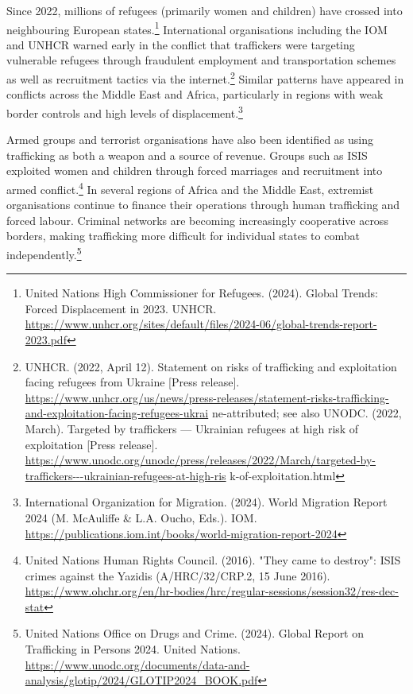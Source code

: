 Since 2022, millions of refugees (primarily women and children) have crossed into neighbouring European states.\footnote{United Nations High Commissioner for Refugees. (2024). Global Trends: Forced Displacement in 2023. UNHCR. \url{https://www.unhcr.org/sites/default/files/2024-06/global-trends-report-2023.pdf}} International organisations including the IOM and UNHCR warned early in the conflict that traffickers were targeting vulnerable refugees through fraudulent employment and transportation schemes as well as recruitment tactics via the internet.\footnote{UNHCR. (2022, April 12). Statement on risks of trafficking and exploitation facing refugees from Ukraine [Press release]. \url{https://www.unhcr.org/us/news/press-releases/statement-risks-trafficking-and-exploitation-facing-refugees-ukrai} ne-attributed; see also UNODC. (2022, March). Targeted by traffickers — Ukrainian refugees at high risk of exploitation [Press release]. \url{https://www.unodc.org/unodc/press/releases/2022/March/targeted-by-traffickers---ukrainian-refugees-at-high-ris} k-of-exploitation.html} Similar patterns have appeared in conflicts across the Middle East and Africa, particularly in regions with weak border controls and high levels of displacement.\footnote{International Organization for Migration. (2024). World Migration Report 2024 (M. McAuliffe \& L.A. Oucho, Eds.). IOM. \url{https://publications.iom.int/books/world-migration-report-2024}}

Armed groups and terrorist organisations have also been identified as using trafficking as both a weapon and a source of revenue. Groups such as ISIS exploited women and children through forced marriages and recruitment into armed conflict.\footnote{United Nations Human Rights Council. (2016). "They came to destroy": ISIS crimes against the Yazidis (A/HRC/32/CRP.2, 15 June 2016). \url{https://www.ohchr.org/en/hr-bodies/hrc/regular-sessions/session32/res-dec-stat}} In several regions of Africa and the Middle East, extremist organisations continue to finance their operations through human trafficking and forced labour. Criminal networks are becoming increasingly cooperative across borders, making trafficking more difficult for individual states to combat independently.\footnote{United Nations Office on Drugs and Crime. (2024). Global Report on Trafficking in Persons 2024. United Nations. \url{https://www.unodc.org/documents/data-and-analysis/glotip/2024/GLOTIP2024_BOOK.pdf}}

